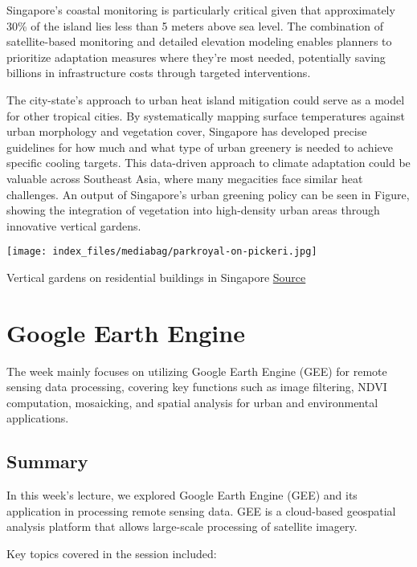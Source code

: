 \documentclass[
  letterpaper,
  DIV=11,
  numbers=noendperiod]{scrreprt}
\begin{document}
Singapore's coastal monitoring is particularly critical given that
approximately 30\% of the island lies less than 5 meters above sea
level. The combination of satellite-based monitoring and detailed
elevation modeling enables planners to prioritize adaptation measures
where they're most needed, potentially saving billions in infrastructure
costs through targeted interventions.

The city-state's approach to urban heat island mitigation could serve as
a model for other tropical cities. By systematically mapping surface
temperatures against urban morphology and vegetation cover, Singapore
has developed precise guidelines for how much and what type of urban
greenery is needed to achieve specific cooling targets. This data-driven
approach to climate adaptation could be valuable across Southeast Asia,
where many megacities face similar heat challenges. An output of
Singapore's urban greening policy can be seen in Figure, showing the
integration of vegetation into high-density urban areas through
innovative vertical gardens.

\texttt{[image: index\_files/mediabag/parkroyal-on-pickeri.jpg]}

Vertical gardens on residential buildings in Singapore
\href{https://www.crabintheair.com/wp-content/uploads/2017/02/parkroyal-on-pickering-review-e1537299078683.jpg}{Source}


\chapter{Google Earth Engine}\label{google-earth-engine}

The week mainly focuses on utilizing Google Earth Engine (GEE) for
remote sensing data processing, covering key functions such as image
filtering, NDVI computation, mosaicking, and spatial analysis for urban
and environmental applications.

\section{Summary}\label{summary-3}

In this week's lecture, we explored Google Earth Engine (GEE) and its
application in processing remote sensing data. GEE is a cloud-based
geospatial analysis platform that allows large-scale processing of
satellite imagery.

Key topics covered in the session included:
\end{document}
